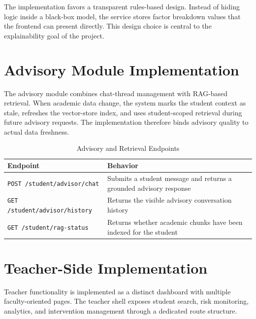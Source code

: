 The implementation favors a transparent rules-based design. Instead of hiding logic inside a black-box model, the service stores factor breakdown values that the frontend can present directly. This design choice is central to the explainability goal of the project.

\section{Advisory Module Implementation}
The advisory module combines chat-thread management with RAG-based retrieval. When academic data change, the system marks the student context as stale, refreshes the vector-store index, and uses student-scoped retrieval during future advisory requests. The implementation therefore binds advisory quality to actual data freshness.

\begin{table}[H]
\centering
\caption{Advisory and Retrieval Endpoints}
\begin{tabularx}{\textwidth}{>{\raggedright\arraybackslash}p{} >{\raggedright\arraybackslash}X}
\toprule
\textbf{Endpoint} & \textbf{Behavior} \\
\midrule
\texttt{POST /student/advisor/chat} & Submits a student message and returns a grounded advisory response \\
\texttt{GET /student/advisor/history} & Returns the visible advisory conversation history \\
\texttt{GET /student/rag-status} & Returns whether academic chunks have been indexed for the student \\
\bottomrule
\end{tabularx}
\end{table}

\section{Teacher-Side Implementation}
Teacher functionality is implemented as a distinct dashboard with multiple faculty-oriented pages. The teacher shell exposes student search, risk monitoring, analytics, and intervention management through a dedicated route structure.


